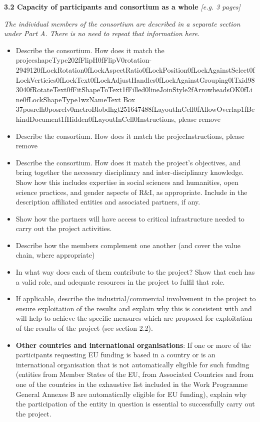 \textbf{3.2 Capacity of participants and consortium as a whole
}\emph{{[}e.g. 3 pages{]} }

\emph{The individual members of the consortium are described in a
separate section under Part A. There is no need to repeat that
information here. }

\begin{itemize}
\item
  Describe the consortium. How does it match the
  projecshapeType202fFlipH0fFlipV0rotation-2949120fLockRotation0fLockAspectRatio0fLockPosition0fLockAgainstSelect0fLockVerticies0fLockText0fLockAdjustHandles0fLockAgainstGrouping0lTxid983040fRotateText0fFitShapeToText1fFilled0lineJoinStyle2fArrowheadsOK0fLine0fLockShapeType1wzNameText
  Box
  37posrelh0posrelv0metroBlobdhgt251647488fLayoutInCell0fAllowOverlap1fBehindDocument1fHidden0fLayoutInCell0Instructions,
  please remove
\item
  Describe the consortium. How does it match the projecInstructions,
  please remove
\item
  Describe the consortium. How does it match the project's objectives,
  and bring together the necessary disciplinary and inter-disciplinary
  knowledge. Show how this includes expertise in social sciences and
  humanities, open science practices, and gender aspects of R\&I, as
  appropriate. Include in the description affiliated entities and
  associated partners, if any.
\item
  Show how the partners will have access to critical infrastructure
  needed to carry out the project activities.
\item
  Describe how the members complement one another (and cover the value
  chain, where appropriate)
\item
  In what way does each of them contribute to the project? Show that
  each has a valid role, and adequate resources in the project to fulfil
  that role.
\item
  If applicable, describe the industrial/commercial involvement in the
  project to ensure exploitation of the results and explain why this is
  consistent with and will help to achieve the specific measures which
  are proposed for exploitation of the results of the project (see
  section 2.2).
\item
  \textbf{Other countries and international organisations}: If one or
  more of the participants requesting EU funding is based in a country
  or is an international organisation that is not automatically eligible
  for such funding (entities from Member States of the EU, from
  Associated Countries and from one of the countries in the exhaustive
  list included in the Work Programme General Annexes B are
  automatically eligible for EU funding), explain why the participation
  of the entity in question is essential to successfully carry out the
  project.
\end{itemize}

